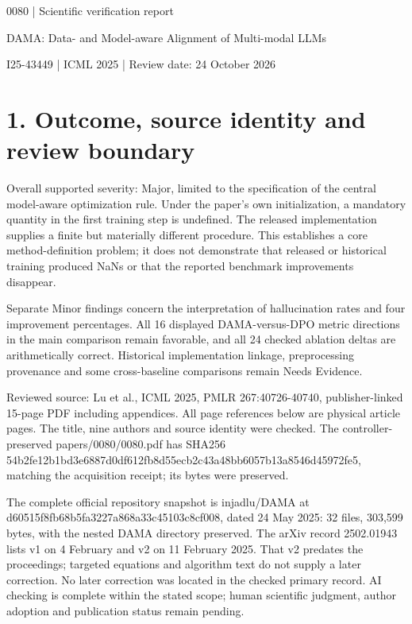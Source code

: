 \documentclass[10pt]{article}
\begin{document}
0080 | Scientific verification report\par
DAMA: Data- and Model-aware Alignment of Multi-modal LLMs\par
I25-43449 | ICML 2025 | Review date: 24 October 2026\par
\section*{1. Outcome, source identity and review boundary}
Overall supported severity: Major, limited to the specification of the central model-aware optimization rule. Under the paper’s own initialization, a mandatory quantity in the first training step is undefined. The released implementation supplies a finite but materially different procedure. This establishes a core method-definition problem; it does not demonstrate that released or historical training produced NaNs or that the reported benchmark improvements disappear.\par
Separate Minor findings concern the interpretation of hallucination rates and four improvement percentages. All 16 displayed DAMA-versus-DPO metric directions in the main comparison remain favorable, and all 24 checked ablation deltas are arithmetically correct. Historical implementation linkage, preprocessing provenance and some cross-baseline comparisons remain Needs Evidence.\par
Reviewed source: Lu et al., ICML 2025, PMLR 267:40726-40740, publisher-linked 15-page PDF including appendices. All page references below are physical article pages. The title, nine authors and source identity were checked. The controller-preserved papers/0080/0080.pdf has SHA256 54b2fe12b1bd3e6887d0df612fb8d55ecb2c43a48bb6057b13a8546d45972fe5, matching the acquisition receipt; its bytes were preserved.\par
The complete official repository snapshot is injadlu/DAMA at d60515f8fb68b5fa3227a868a33c45103c8cf008, dated 24 May 2025: 32 files, 303,599 bytes, with the nested DAMA directory preserved. The arXiv record 2502.01943 lists v1 on 4 February and v2 on 11 February 2025. That v2 predates the proceedings; targeted equations and algorithm text do not supply a later correction. No later correction was located in the checked primary record. AI checking is complete within the stated scope; human scientific judgment, author adoption and publication status remain pending.\par
\end{document}

